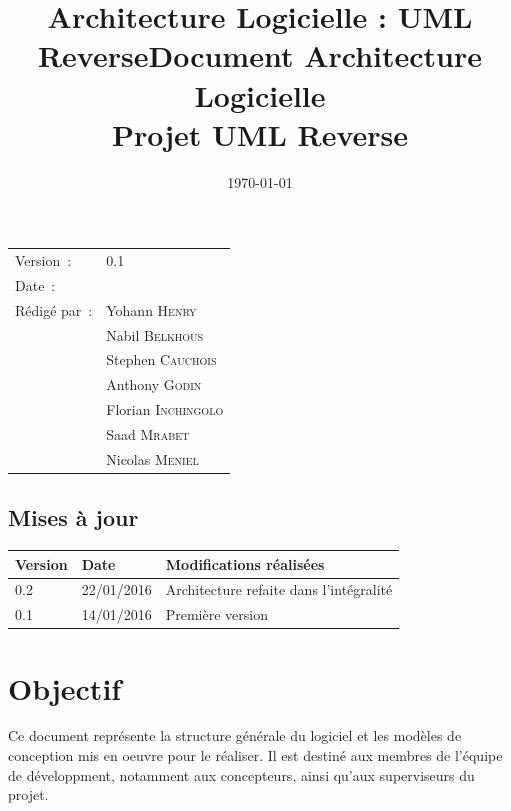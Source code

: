 \documentclass[a4paper,10pt]{article}
\title{Architecture Logicielle : UML Reverse}
\title{\bfseries Document Architecture Logicielle \\Projet UML Reverse}
\begin{document}
\maketitle
\begin{center}
\begin{tabular}{ll}
  Version~: & 0.1\\[.5em]
  Date~: & \date{\today}\\[.5em]
  Rédigé par~:  & Yohann \textsc{Henry}\\
		& Nabil \textsc{Belkhous}\\[.5em]   
		& Stephen \textsc{Cauchois}\\
		& Anthony \textsc{Godin}\\
		& Florian \textsc{Inchingolo}\\
		& Saad \textsc{Mrabet}\\
		& Nicolas \textsc{Meniel}\\
\end{tabular}
\end{center}

\newpage
\begin{center}
    \section*{Mises à jour}
    \begin{tabular}{|l|l|p{8cm}|}
        \hline{\textbf{Version}} & {\textbf{Date}} & {\textbf{Modifications réalisées}}\\\hline
        {0.2} & {22/01/2016} & {Architecture refaite dans l'intégralité}\\\hline
        {0.1} & {14/01/2016} & {Première version}\\\hline
    \end{tabular}
\end{center}

\newpage
\tableofcontents
\newpage


\section{Objectif}
Ce document représente la structure générale du logiciel et les modèles de conception mis en oeuvre pour le réaliser.
Il est destiné aux membres de l'équipe de développment, notamment aux concepteurs, ainsi qu'aux superviseurs du projet.
\end{document}
